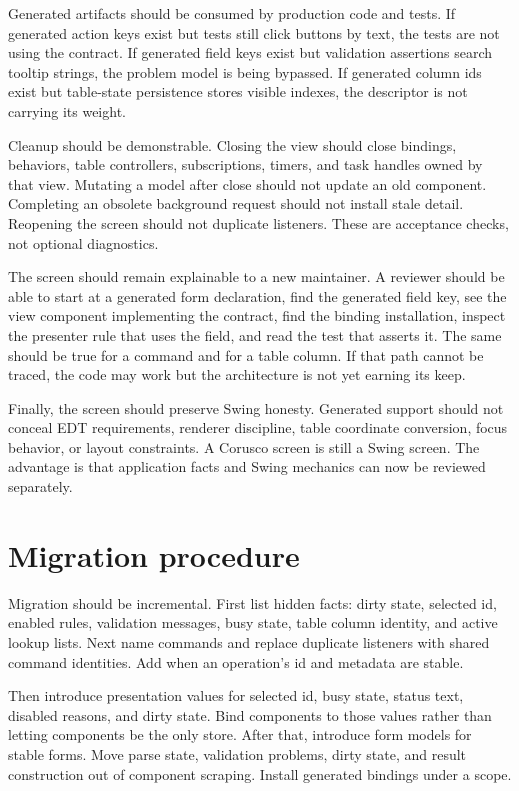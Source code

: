 Generated artifacts should be consumed by production code and tests. If generated action keys exist but tests still click buttons by text, the tests are not using the contract. If generated field keys exist but validation assertions search tooltip strings, the problem model is being bypassed. If generated column ids exist but table-state persistence stores visible indexes, the descriptor is not carrying its weight.

Cleanup should be demonstrable. Closing the view should close bindings, behaviors, table controllers, subscriptions, timers, and task handles owned by that view. Mutating a model after close should not update an old component. Completing an obsolete background request should not install stale detail. Reopening the screen should not duplicate listeners. These are acceptance checks, not optional diagnostics.

The screen should remain explainable to a new maintainer. A reviewer should be able to start at a generated form declaration, find the generated field key, see the view component implementing the contract, find the binding installation, inspect the presenter rule that uses the field, and read the test that asserts it. The same should be true for a command and for a table column. If that path cannot be traced, the code may work but the architecture is not yet earning its keep.

Finally, the screen should preserve Swing honesty. Generated support should not conceal EDT requirements, renderer discipline, table coordinate conversion, focus behavior, or layout constraints. A Corusco screen is still a Swing screen. The advantage is that application facts and Swing mechanics can now be reviewed separately.

\section{Migration procedure}

Migration should be incremental. First list hidden facts: dirty state, selected id, enabled rules, validation messages, busy state, table column identity, and active lookup lists. Next name commands and replace duplicate listeners with shared command identities. Add  when an operation's id and metadata are stable.

Then introduce presentation values for selected id, busy state, status text, disabled reasons, and dirty state. Bind components to those values rather than letting components be the only store. After that, introduce form models for stable forms. Move parse state, validation problems, dirty state, and result construction out of component scraping. Install generated bindings under a scope.

